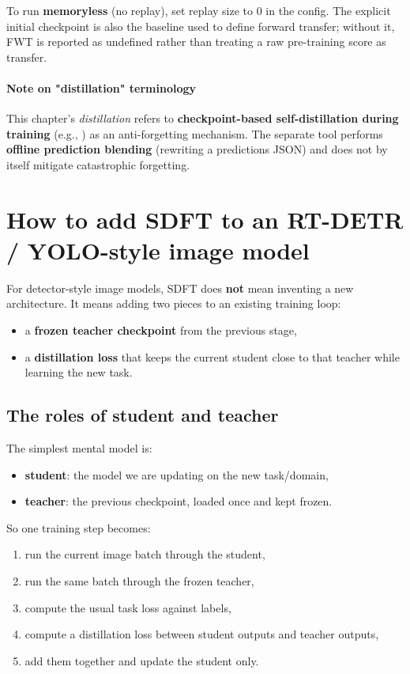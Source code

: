 To run \textbf{memoryless} (no replay), set replay size to 0 in the config.
The explicit initial checkpoint is also the baseline used to define forward
transfer; without it, FWT is reported as undefined rather than treating a raw
pre-training score as transfer.

\paragraph{Note on "distillation" terminology}
This chapter's \emph{distillation} refers to \textbf{checkpoint-based self-distillation during training} (e.g., ) as an anti-forgetting mechanism.
The separate tool  performs \textbf{offline prediction blending} (rewriting a predictions JSON) and does not by itself mitigate catastrophic forgetting.

\section{How to add SDFT to an RT-DETR / YOLO-style image model}

For detector-style image models, SDFT does \textbf{not} mean inventing a new architecture.
It means adding two pieces to an existing training loop:
\begin{itemize}
  \item a \textbf{frozen teacher checkpoint} from the previous stage,
  \item a \textbf{distillation loss} that keeps the current student close to that teacher while learning the new task.
\end{itemize}

\subsection{The roles of student and teacher}

The simplest mental model is:
\begin{itemize}
  \item \textbf{student}: the model we are updating on the new task/domain,
  \item \textbf{teacher}: the previous checkpoint, loaded once and kept frozen.
\end{itemize}

So one training step becomes:
\begin{enumerate}
  \item run the current image batch through the student,
  \item run the same batch through the frozen teacher,
  \item compute the usual task loss against labels,
  \item compute a distillation loss between student outputs and teacher outputs,
  \item add them together and update the student only.
\end{enumerate}

